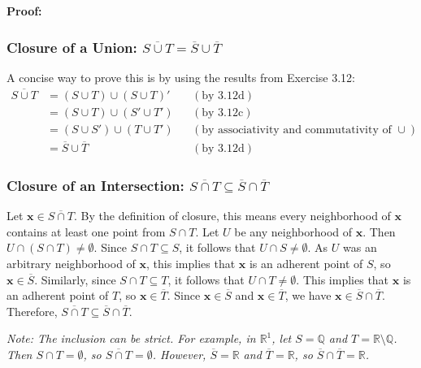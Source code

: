 \textbf{Proof:}
\subsubsection*{Closure of a Union: $\overline{S \cup T} = \overline{S} \cup \overline{T}$}
A concise way to prove this is by using the results from Exercise 3.12:
\begin{align*}
\overline{S \cup T} &= (S \cup T) \cup (S \cup T)' && (\text{by 3.12d}) \\
&= (S \cup T) \cup (S' \cup T') && (\text{by 3.12c}) \\
&= (S \cup S') \cup (T \cup T') && (\text{by associativity and commutativity of } \cup) \\
&= \overline{S} \cup \overline{T} && (\text{by 3.12d})
\end{align*}

\subsubsection*{Closure of an Intersection: $\overline{S \cap T} \subseteq \overline{S} \cap \overline{T}$}
Let $\mathbf{x} \in \overline{S \cap T}$. By the definition of closure, this means every neighborhood of $\mathbf{x}$ contains at least one point from $S \cap T$.
Let $U$ be any neighborhood of $\mathbf{x}$. Then $U \cap (S \cap T) \neq \emptyset$.
Since $S \cap T \subseteq S$, it follows that $U \cap S \neq \emptyset$. As $U$ was an arbitrary neighborhood of $\mathbf{x}$, this implies that $\mathbf{x}$ is an adherent point of $S$, so $\mathbf{x} \in \overline{S}$.
Similarly, since $S \cap T \subseteq T$, it follows that $U \cap T \neq \emptyset$. This implies that $\mathbf{x}$ is an adherent point of $T$, so $\mathbf{x} \in \overline{T}$.
Since $\mathbf{x} \in \overline{S}$ and $\mathbf{x} \in \overline{T}$, we have $\mathbf{x} \in \overline{S} \cap \overline{T}$.
Therefore, $\overline{S \cap T} \subseteq \overline{S} \cap \overline{T}$.

\textit{Note: The inclusion can be strict. For example, in $\mathbb{R}^1$, let $S = \mathbb{Q}$ and $T = \mathbb{R} \setminus \mathbb{Q}$. Then $S \cap T = \emptyset$, so $\overline{S \cap T} = \emptyset$. However, $\overline{S} = \mathbb{R}$ and $\overline{T} = \mathbb{R}$, so $\overline{S} \cap \overline{T} = \mathbb{R}$.}

